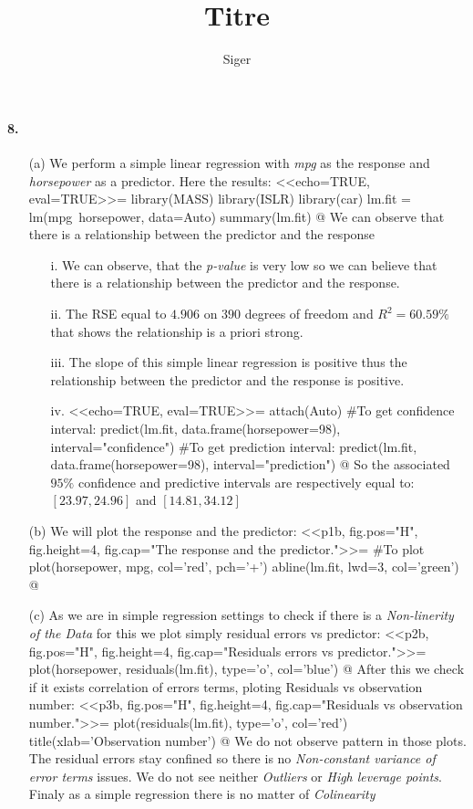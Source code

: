 \documentclass[a4paper, 10pt]{scrartcl}  %
\title{Titre}
\author{Siger}
\begin{document}
\paragraph{8.}
\begin{itemize}
	\item[(a)] We perform a simple linear regression with \emph{
		mpg} as the response and \emph{horsepower} as a 
		predictor. Here the results:
<<echo=TRUE, eval=TRUE>>=
library(MASS)
library(ISLR)
library(car)
lm.fit = lm(mpg~horsepower, data=Auto)
summary(lm.fit)
@
We can observe that there is a relationship between the predictor and 
the response
		\begin{itemize}
			\item[i.] We can observe, that the \emph{
				p-value} is very low so we can believe
				that there is a relationship between
				the predictor and the response.
			\item[ii.] The RSE equal to $4.906$ on $390$
				degrees of freedom and $R^{2}=60.59\%$
				that shows the relationship is a priori
				strong.
			\item[iii.] The slope of this simple linear
				regression is positive thus the
				relationship between the predictor and
				the response is positive.
			\item[iv.]
<<echo=TRUE, eval=TRUE>>=
attach(Auto)
#To get confidence interval:
predict(lm.fit, data.frame(horsepower=98), interval="confidence")
#To get prediction interval:
predict(lm.fit, data.frame(horsepower=98), interval="prediction")
@
				So the associated $95\%$ confidence and
				predictive intervals are respectively
				equal to: $[23.97, 24.96]$ and $[14.81,
				34.12]$
		\end{itemize}
	\item[(b)] We will plot the response and the predictor:
<<p1b, fig.pos="H", fig.height=4, fig.cap="The response and the predictor.">>=
#To plot 
plot(horsepower, mpg, col='red', pch='+')
abline(lm.fit, lwd=3, col='green')
@
	\item[(c)] As we are in simple regression settings to check
		if there is a \emph{Non-linerity of the Data} for this
		we plot simply residual errors vs predictor:
<<p2b, fig.pos="H", fig.height=4, fig.cap="Residuals errors vs predictor.">>=
plot(horsepower, residuals(lm.fit), type='o', col='blue')
@
		After this we check if it exists correlation of errors
		terms, ploting Residuals vs observation number:
<<p3b, fig.pos="H", fig.height=4, fig.cap="Residuals vs observation number.">>=
plot(residuals(lm.fit), type='o', col='red')
title(xlab='Observation number')
@
We do not observe pattern in those plots.\\The residual errors stay
confined so there is no \emph{Non-constant variance of error terms}
issues. We do not see neither \emph{Outliers} or \emph{High leverage
points}. Finaly as a simple regression there is no matter of \emph{
Colinearity}
\end{itemize}
\end{document}

